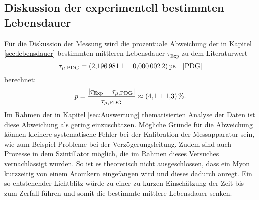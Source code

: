 \subsection{Diskussion der experimentell bestimmten Lebensdauer}
Für die Diskussion der Messung wird die prozentuale Abweichung der in Kapitel \ref{sec:lebensdauer} bestimmten mittleren Lebensdauer $\tau_\text{Exp}$ 
zu dem Literaturwert 
\begin{equation*}
    \tau_{\mu,\text{PDG}}=\SI{2.1969811 \pm0.0000022}{\micro\second} \quad\text{\cite{PDG}}    
\end{equation*}
berechnet:
\begin{equation*}
    p=\frac{|\tau_\text{Exp}-\tau_{\mu,\text{PDG}}|}{\tau_{\mu,\text{PDG}}}\approx \SI{4.1\pm1.3}{\percent}.
\end{equation*}
Im Rahmen der in Kapitel \ref{sec:Auswertung} thematisierten Analyse der Daten ist diese Abweichung als gering einzuschätzen. Mögliche Gründe für die Abweichung
können kleinere systematische Fehler bei der Kalibration der Messapparatur sein, wie zum Beispiel Probleme bei der Verzögerungsleitung. Zudem sind auch Prozesse in dem
Szintillator möglich, die im Rahmen dieses Versuches vernachlässigt wurden. So ist es theoretisch nicht ausgeschlossen, dass ein Myon kurzzeitig von einem Atomkern 
eingefangen wird und dieses dadurch anregt. Ein so entstehender Lichtblitz würde zu einer zu kurzen Einschätzung der Zeit bis zum Zerfall führen und somit die 
bestimmte mittlere Lebensdauer senken.
